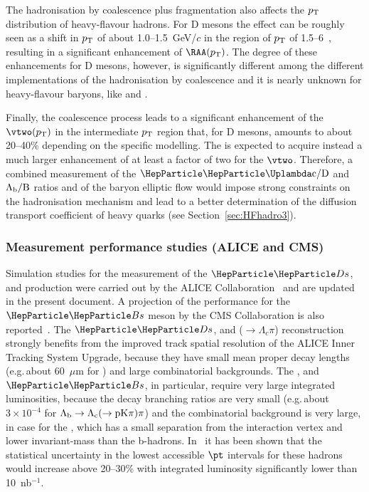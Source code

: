The hadronisation by coalescence plus fragmentation also affects the $p\sb{\scriptstyle\mathrm{T}}$ distribution  of heavy-flavour hadrons. For D mesons the effect can be roughly seen as a
shift in $p\sb{\scriptstyle\mathrm{T}}$ of about 1.0--1.5~GeV/$c$ in the region of $p\sb{\scriptstyle\mathrm{T}}$ of 1.5--6~\UGeVc, resulting in a
significant enhancement of $\RAA(\pT)$. The degree of these enhancements for D mesons, however, is
significantly different  among the different implementations of the hadronisation
by coalescence and it is nearly unknown for heavy-flavour baryons, like \PGLb and \PGLc.

Finally, the coalescence process leads to a significant enhancement of the $\vtwo(\pT)$ in the
intermediate $p\sb{\scriptstyle\mathrm{T}}$ region that, for D mesons, amounts to about 20--40\% depending on the
specific modelling. The \PGLc is expected to acquire instead a much 
larger enhancement of at least a factor of two for the $\vtwo$. Therefore, a combined measurement of the
$\rm \PGLc/D$ and $\rm \Lambda_b/B$ ratios and of the baryon elliptic flow would impose strong constraints
on the hadronisation mechanism and lead to a better determination of the diffusion transport coefficient of heavy quarks (see Section~\ref{sec:HFhadro3}).

\subsubsection{Measurement performance studies (ALICE and CMS)}
\label{sec:HFhadro2}


Simulation studies for the measurement of the $\PDs$, \PGLc and \PGLb
production were carried out by the ALICE Collaboration~\cite{Abelev:1625842} and are updated in the present document. A projection of the performance for the $\PBs$ meson by the CMS Collaboration is also reported~\cite{CMS-PAS-FTR-17-002}. The $\PDs$, \PGLc and \PGLb ($\to\Lambda_c\pi$) reconstruction strongly benefits from the improved track spatial resolution of the ALICE Inner Tracking System Upgrade, because they have small mean proper decay lengths (e.g.\,about 60~$\mu$m for \PGLc)
and large combinatorial backgrounds. The \PGLc, \PGLb and $\PBs$, in particular, require very large integrated luminosities, because the decay branching ratios are very small (e.g.\,about $3\times 10^{-4}$ for $\rm \Lambda_b\to\Lambda_c(\to pK\pi)\pi$) and the combinatorial background is very large, in case for the \PGLc, which has a small separation from the interaction vertex and lower invariant-mass than the b-hadrons. In~\cite{CMS-PAS-FTR-17-002} it has been shown that the statistical uncertainty in the lowest accessible $\pt$ intervals for these hadrons would increase above 20--30\% with integrated luminosity significantly lower than 10~nb$^{-1}$.

